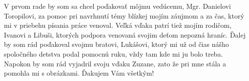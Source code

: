
\noindent
V prvom rade by som sa chcel poďakovať môjmu vedúcemu, Mgr. Danielovi Toropilovi, za pomoc pri navrhnutí témy blízkej mojím záujmom a za čas, ktorý mi v priebehu písania práce venoval. Veľká vďaka patrí tiež mojím rodičom, Ivanovi a Libuši, ktorých podpora venovaná svojim deťom nepozná hraníc. Ďalej by som rád poďakoval svojmu bratovi, Lukášovi, ktorý mi už od čias nášho spoločného detstva podal pomocnú ruku, vždy tam kde mi ju bolo treba. Napokon by som rád vyjadril svoju vďaku Zuzane, zato že pri mne stála a pomohla mi s obrázkami. Ďakujem Vám všetkým!